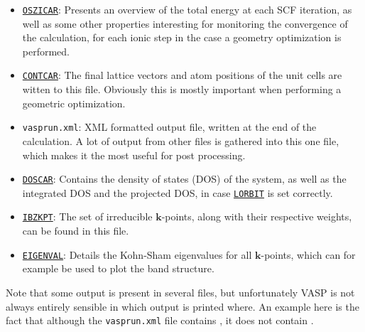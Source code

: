 \begin{refsection}
\begin{itemize}
 \label{appendix:sec-OSZICAR} 
\item \href{https://www.vasp.at/wiki/index.php/OSZICAR}{\texttt{OSZICAR}}: 
Presents an overview of the total energy at each SCF iteration, as well 
as some other properties interesting for monitoring the convergence of the 
calculation, for each ionic step in the case a geometry optimization is performed.

 \label{appendix:sec-CONTCAR} 
\item \href{https://www.vasp.at/wiki/index.php/CONTCAR}{\texttt{CONTCAR}}: 
The final lattice vectors and atom positions of the unit cells are witten to 
this file. Obviously this is mostly important when performing a geometric 
optimization.

 \label{appendix:sec-vasprun} 
\item \texttt{vasprun.xml}: 
XML formatted output file, written at the end of the calculation. A lot of 
output from other files is gathered into this one file, which makes it the 
most useful for post processing.

 \label{appendix:sec-DOSCAR} 
\item \href{https://www.vasp.at/wiki/index.php/DOSCAR}{\texttt{DOSCAR}}:
Contains the density of states (DOS) of the system, as well as the integrated DOS 
and the projected DOS, in case \href{https://www.vasp.at/wiki/index.php/LORBIT}{\texttt{LORBIT}} is set correctly.

 \label{appendix:sec-IBZKPT} 
\item \href{https://www.vasp.at/wiki/index.php/IBZKPT}{\texttt{IBZKPT}}: 
The set of irreducible $\mathbf{k}$-points, along with their respective 
weights, can be found in this file.

 \label{appendix:sec-EIGENVAL} 
\item \href{https://www.vasp.at/wiki/index.php/EIGENVAL}{\texttt{EIGENVAL}}: 
Details the Kohn-Sham eigenvalues for all $\mathbf{k}$-points, which can 
for example be used to plot the band structure. 

\end{itemize} 

Note that some output is present in several files, but unfortunately 
VASP is not always entirely sensible in which output is printed where. 
An example here is the fact that although the \texttt{vasprun.xml} file 
contains , it does not 
contain . 
 

\end{refsection}
